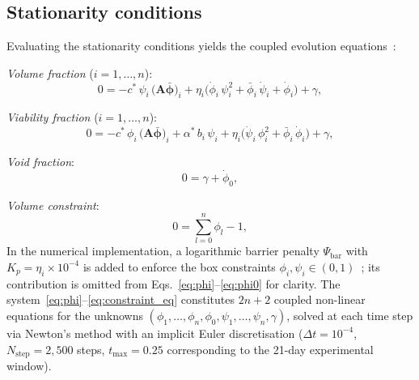 \documentclass[11pt,a4paper]{article}
\newcommand{\bphi}{\boldsymbol{\phi}}
\begin{document}
\subsection{Stationarity conditions}


Evaluating the stationarity conditions yields the coupled evolution equations~\cite{Klempt2025ContinuumBiofilm}:

\medskip\noindent
\textit{Volume fraction} ($i=1,\dots,n$):
\begin{equation}
0 = -c^*\,\psi_i\,\bigl(\mathbf{A}\bar{\bphi}\bigr)_i
    + \eta_i\bigl(\dot\phi_i\,\psi_i^2 + \bar\phi_i\,\dot\psi_i + \dot\phi_i\bigr)
    + \gamma,
\label{eq:phi}
\end{equation}

\noindent\textit{Viability fraction} ($i=1,\dots,n$):
\begin{equation}
0 = -c^*\,\phi_i\,\bigl(\mathbf{A}\bar{\bphi}\bigr)_i
    + \alpha^*\,b_i\,\psi_i
    + \eta_i\bigl(\dot\psi_i\,\phi_i^2 + \bar\phi_i\,\dot\phi_i\bigr)
    + \gamma,
\label{eq:psi_evol}
\end{equation}

\noindent\textit{Void fraction}:
\begin{equation}
0 = \gamma + \dot\phi_0,
\label{eq:phi0}
\end{equation}

\noindent\textit{Volume constraint}:
\begin{equation}
0 = \sum_{l=0}^{n}\phi_l - 1,
\label{eq:constraint_eq}
\end{equation}
In the numerical implementation, a logarithmic barrier penalty $\Psi_{\mathrm{bar}}$ with $K_p=\eta_i\times10^{-4}$ is added to enforce the box constraints $\phi_i,\psi_i\in(0,1)$~\cite{Klempt2025ContinuumBiofilm}; its contribution is omitted from Eqs.~\eqref{eq:phi}--\eqref{eq:phi0} for clarity.
The system~\eqref{eq:phi}--\eqref{eq:constraint_eq} constitutes $2n+2$ coupled non-linear equations for the unknowns $(\phi_1,\dots,\phi_n,\phi_0,\psi_1,\dots,\psi_n,\gamma)$, solved at each time step via Newton's method with an implicit Euler discretisation ($\Delta t = 10^{-4}$, $N_{\mathrm{step}}=2{,}500$ steps, $t_{\max}=0.25$ corresponding to the 21-day experimental window).
\end{document}
